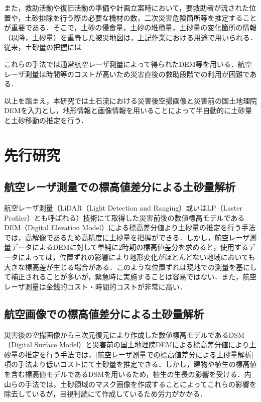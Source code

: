     また，救助活動や復旧活動の準備や計画立案時において，要救助者が流された位置や，土砂排除を行う際の必要な機材の数，二次災害危険箇所等を推定することが重要である．そこで，土砂の侵食量，土砂の堆積量，土砂量の変化箇所の情報（以降，土砂量）を重畳した被災地図は，上記作業における用途で用いられる．従来，土砂量の把握には




    これらの手法では通常航空レーザ測量によって得られたDEM等を用いる．航空レーザ測量は時間等のコストが高いため災害直後の救助段階での利用が困難である．

    以上を踏まえ，本研究では土石流における災害後空撮画像と災害前の国土地理院DEM\cite{基盤地図情報}を入力とし，地形情報と画像情報を用いることによって半自動的に土砂量と土砂移動の推定を行う．





  \section{先行研究}
    \subsection{航空レーザ測量での標高値差分による土砂量解析}
      航空レーザ測量（LiDAR（Light Detection and Ranging）或いはLP（Laster Profiler）とも呼ばれる）技術にて取得した災害前後の数値標高モデルであるDEM（Digital Elevation Model）による標高差分値より土砂量の推定を行う手法\cite{土砂量解析1, 土砂量解析2}では，高解像であるため高精度に土砂量を把握ができる．しかし，航空レーザ測量データによるDEMに対して単純に2時期の標高値差分を求めると，使用するデータによっては，位置ずれの影響により地形変化がほとんどない地域においても大きな標高差が生じる場合がある．このような位置ずれは現地での測量を基にして補正されることが多いが，緊急時に実施することは容易ではない．また，航空レーザ測量は金銭的コスト・時間的コストが非常に高い．

    \subsection{航空画像での標高値差分による土砂量解析}
      災害後の空撮画像から三次元復元により作成した数値標高モデルであるDSM（Digital Surface Model）と災害前の国土地理院DEMによる標高差分値により土砂量の推定を行う手法\cite{土砂量解析3}では，\ref{航空レーザ測量での標高値差分による土砂量解析}項の手法より低いコストにて土砂量を推定できる．しかし，建物や植生の標高値を含む標高値モデルであるDSMを用いるため，植生の生長の影響を受ける．内山らの手法\cite{土砂量解析4}では，土砂領域のマスク画像を作成することによってこれらの影響を除去しているが，目視判読にて作成しているため労力がかかる．
    
